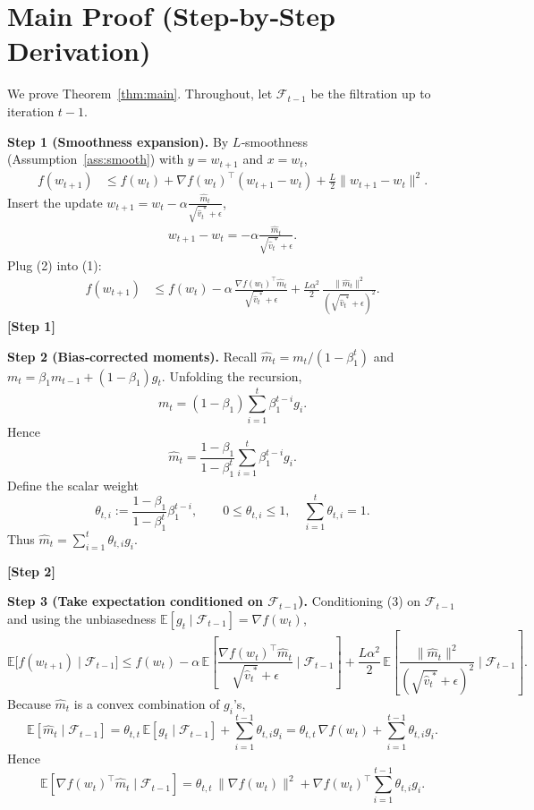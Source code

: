 \documentclass{article}
\newcommand{\E}{\mathbb{E}}
\begin{document}
\section*{Main Proof (Step‑by‑Step Derivation)}
We prove Theorem~\ref{thm:main}.  Throughout, let $\mathcal{F}_{t-1}$ be the filtration up to iteration $t-1$.

\medskip
\noindent\textbf{Step 1 (Smoothness expansion).}  
By $L$‑smoothness (Assumption~\ref{ass:smooth}) with $y=w_{t+1}$ and $x=w_{t}$,
\begin{align}
f(w_{t+1}) 
&\le f(w_{t})+\nabla f(w_{t})^{\top}(w_{t+1}-w_{t})
        +\frac{L}{2}\|w_{t+1}-w_{t}\|^{2}. \tag{1}
\end{align}
Insert the update $w_{t+1}=w_{t}-\alpha\frac{\hat m_{t}}{\sqrt{\hat v_{t}^{\;*}}+\epsilon}$,
\begin{align}
w_{t+1}-w_{t}
    =-\alpha\frac{\hat m_{t}}{\sqrt{\hat v_{t}^{\;*}}+\epsilon}. \tag{2}
\end{align}
Plug (2) into (1):
\begin{align}
f(w_{t+1}) 
&\le f(w_{t})-\alpha\,
   \frac{\nabla f(w_{t})^{\top}\hat m_{t}}{\sqrt{\hat v_{t}^{\;*}}+\epsilon}
   +\frac{L\alpha^{2}}{2}\,
   \frac{\|\hat m_{t}\|^{2}}{(\sqrt{\hat v_{t}^{\;*}}+\epsilon)^{2}}. \tag{3}
\end{align}
\textbf{[Step 1]}

\medskip
\noindent\textbf{Step 2 (Bias‑corrected moments).}  
Recall $\hat m_{t}=m_{t}/(1-\beta_{1}^{t})$ and $m_{t}=\beta_{1}m_{t-1}+(1-\beta_{1})g_{t}$.
Unfolding the recursion,
\[
m_{t}= (1-\beta_{1})\sum_{i=1}^{t}\beta_{1}^{t-i}g_{i}.
\]
Hence
\[
\hat m_{t}= \frac{1-\beta_{1}}{1-\beta_{1}^{t}}
            \sum_{i=1}^{t}\beta_{1}^{t-i}g_{i}. \tag{4}
\]
Define the scalar weight
\[
\theta_{t,i}:=\frac{1-\beta_{1}}{1-\beta_{1}^{t}}\beta_{1}^{t-i},\qquad
0\le\theta_{t,i}\le 1,\quad\sum_{i=1}^{t}\theta_{t,i}=1. \tag{5}
\]
Thus $\hat m_{t}= \sum_{i=1}^{t}\theta_{t,i}g_{i}$.

\textbf{[Step 2]}

\medskip
\noindent\textbf{Step 3 (Take expectation conditioned on $\mathcal{F}_{t-1}$).}  
Conditioning (3) on $\mathcal{F}_{t-1}$ and using the unbiasedness
$\E[g_{t}\mid\mathcal{F}_{t-1}]=\nabla f(w_{t})$,
\[
\E\!\bigl[f(w_{t+1})\mid\mathcal{F}_{t-1}\bigr]
\le f(w_{t})
-\alpha\,
\E\!\left[\frac{\nabla f(w_{t})^{\top}\hat m_{t}}{\sqrt{\hat v_{t}^{\;*}}+\epsilon}\mid\mathcal{F}_{t-1}\right]
+\frac{L\alpha^{2}}{2}\,
\E\!\left[\frac{\|\hat m_{t}\|^{2}}{(\sqrt{\hat v_{t}^{\;*}}+\epsilon)^{2}}\mid\mathcal{F}_{t-1}\right].
\tag{6}
\]
Because $\hat m_{t}$ is a convex combination of $g_{i}$'s,
\[
\E[\hat m_{t}\mid\mathcal{F}_{t-1}]
   =\theta_{t,t}\,\E[g_{t}\mid\mathcal{F}_{t-1}]
    +\sum_{i=1}^{t-1}\theta_{t,i}g_{i}
   =\theta_{t,t}\,\nabla f(w_{t})+\sum_{i=1}^{t-1}\theta_{t,i}g_{i}.
\]
Hence
\[
\E\!\left[\nabla f(w_{t})^{\top}\hat m_{t}\mid\mathcal{F}_{t-1}\right]
= \theta_{t,t}\,\|\nabla f(w_{t})\|^{2}
  +\nabla f(w_{t})^{\top}\!\!\sum_{i=1}^{t-1}\theta_{t,i}g_{i}. \tag{7}
\]
\end{document}
